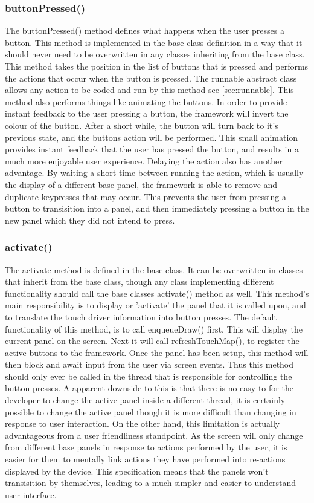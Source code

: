 \subsubsection{buttonPressed()}
\label{sec:base:butpress}
The buttonPressed() method defines what happens when the user presses a button. This method is implemented in the base class definition in a way that it should never need to be overwritten in any classes inheriting from the base class. This method takes the position in the list of buttons that is pressed and performs the actions that occur when the button is pressed. The runnable abstract class allows any action to be coded and run by this method see \ref{sec:runnable}. This method also performs things like animating the buttons. In order to provide instant feedback to the user pressing a button, the framework will invert the colour of the button. After a short while, the button will turn back to it's previous state, and the buttons action will be performed. This small animation provides instant feedback that the user has pressed the button, and results in a much more enjoyable user experience. Delaying the action also has another advantage. By waiting a short time between running the action, which is usually the display of a different base panel, the framework is able to remove and duplicate keypresses that may occur. This prevents the user from pressing a button to transisition into a panel, and then immediately pressing a button in the new panel which they did not intend to press.

\subsubsection{activate()}
\label{sec:activate}

The activate method is defined in the base class. It can be overwritten in classes that inherit from the base class, though any class implementing different functionality should call the base classes activate() method as well. This method's main responsibility is to display or 'activate' the panel that it is called upon, and to translate the touch driver information into button presses. The default functionality of this method, is to call enqueueDraw() first. This will display the current panel on the screen. Next it will call refreshTouchMap(), to register the active buttons to the framework. Once the panel has been setup, this method will then block and await input from the user via screen events. Thus this method should only ever be called in the thread that is responsible for controlling the button presses. A apparent downside to this is that there is no easy to for the developer to change the active panel inside a different thread, it is certainly possible to change the active panel though it is more difficult than changing in response to user interaction. On the other hand, this limitation is actually advantageous from a user friendliness standpoint. As the screen will only change from different base panels in response to actions performed by the user, it is easier for them to mentally link actions they have performed into re-actions displayed by the device. This specification means that the panels won't transisition by themselves, leading to a much simpler and easier to understand user interface. 

